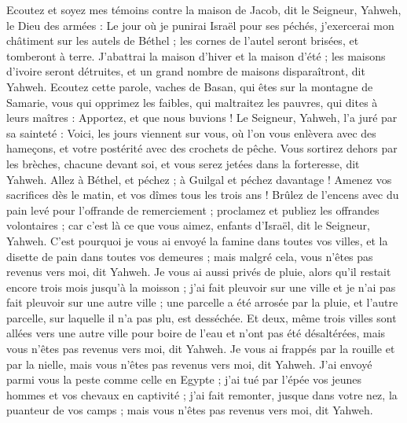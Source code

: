 \begin{multicols}{2}
Ecoutez et soyez mes témoins contre la maison de Jacob, dit le Seigneur, Yahweh, le Dieu des armées :
Le jour où je punirai Israël pour ses péchés, j’exercerai mon châtiment sur les autels de Béthel ; les cornes de l'autel seront brisées, et tomberont à terre.
J’abattrai la maison d'hiver et la maison d'été ; les maisons d'ivoire seront détruites, et un grand nombre de maisons disparaîtront, dit Yahweh.
\VerseOne{}Ecoutez cette parole, vaches de Basan, qui êtes sur la montagne de Samarie, vous qui opprimez les faibles, qui maltraitez les pauvres, qui dites à leurs maîtres : Apportez, et que nous buvions !
Le Seigneur, Yahweh, l’a juré par sa sainteté : Voici, les jours viennent sur vous, où l’on vous enlèvera avec des hameçons, et votre postérité avec des crochets de pêche.
Vous sortirez dehors par les brèches, chacune devant soi, et vous serez jetées dans la forteresse, dit Yahweh.
Allez à Béthel, et péchez ; à Guilgal et péchez davantage ! Amenez vos sacrifices dès le matin, et vos dîmes tous les trois ans !
Brûlez de l’encens avec du pain levé pour l’offrande de remerciement ; proclamez et publiez les offrandes volontaires ; car c’est là ce que vous aimez, enfants d'Israël, dit le Seigneur, Yahweh.
C'est pourquoi je vous ai envoyé la famine dans toutes vos villes, et la disette de pain dans toutes vos demeures ; mais malgré cela, vous n’êtes pas revenus vers moi, dit Yahweh.
Je vous ai aussi privés de pluie, alors qu’il restait encore trois mois jusqu'à la moisson ; j'ai fait pleuvoir sur une ville et je n'ai pas fait pleuvoir sur une autre ville ; une parcelle a été arrosée par la pluie, et l'autre parcelle, sur laquelle il n'a pas plu, est desséchée.
Et deux, même trois villes sont allées vers une autre ville pour boire de l'eau et n'ont pas été désaltérées, mais vous n’êtes pas revenus vers moi, dit Yahweh.
Je vous ai frappés par la rouille et par la nielle, mais vous n’êtes pas revenus vers moi, dit Yahweh.
J’ai envoyé parmi vous la peste comme celle en Egypte ; j'ai tué par l'épée vos jeunes hommes et vos chevaux en captivité ; j'ai fait remonter, jusque dans votre nez, la puanteur de vos camps ; mais vous n’êtes pas revenus vers moi, dit Yahweh.

\end{multicols}

